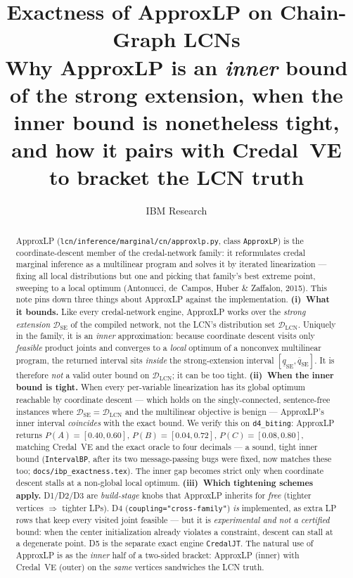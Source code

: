 \documentclass[11pt]{article}
\title{Exactness of ApproxLP on Chain-Graph LCNs\\
\large Why ApproxLP is an \emph{inner} bound of the strong extension, when the
inner bound is nonetheless tight, and how it pairs with Credal~VE to bracket the
LCN truth}
\author{IBM Research}
\date{}
\newcommand{\lo}{\underline}
\newcommand{\hi}{\overline}
\newcommand{\DSE}{\mathcal{D}_{\mathrm{SE}}}
\newcommand{\DLCN}{\mathcal{D}_{\mathrm{LCN}}}
\begin{document}
\maketitle

\begin{abstract}
ApproxLP (\texttt{lcn/inference/marginal/cn/approxlp.py}, class \texttt{ApproxLP}) is the
coordinate-descent member of the credal-network family: it reformulates credal marginal inference as
a multilinear program and solves it by iterated linearization --- fixing all local distributions but
one and picking that family's best extreme point, sweeping to a local optimum (Antonucci, de~Campos,
Huber \& Zaffalon, 2015). This note pins down three things about ApproxLP against the implementation.
\textbf{(i)~What it bounds.} Like every credal-network engine, ApproxLP works over the \emph{strong
extension} $\DSE$ of the compiled network, not the LCN's distribution set $\DLCN$. Uniquely in the
family, it is an \emph{inner} approximation: because coordinate descent visits only \emph{feasible}
product joints and converges to a \emph{local} optimum of a nonconvex multilinear program, the
returned interval sits \emph{inside} the strong-extension interval $[\lo q_{\mathrm{SE}},\hi
q_{\mathrm{SE}}]$. It is therefore \emph{not} a valid outer bound on $\DLCN$; it can be too tight.
\textbf{(ii)~When the inner bound is tight.} When every per-variable linearization has its global
optimum reachable by coordinate descent --- which holds on the singly-connected, sentence-free
instances where $\DSE=\DLCN$ and the multilinear objective is benign --- ApproxLP's inner interval
\emph{coincides} with the exact bound. We verify this on \texttt{d4\_biting}: ApproxLP returns
$P(A){=}[0.40,0.60]$, $P(B){=}[0.04,0.72]$, $P(C){=}[0.08,0.80]$, matching Credal~VE and the exact
oracle to four decimals --- a sound, tight inner bound (\texttt{IntervalBP}, after its two
message-passing bugs were fixed, now matches these too; \texttt{docs/ibp\_exactness.tex}). The inner
gap becomes strict only when coordinate descent stalls at a non-global local optimum.
\textbf{(iii)~Which
tightening schemes apply.} D1/D2/D3 are \emph{build-stage} knobs that ApproxLP inherits for
\emph{free} (tighter vertices $\Rightarrow$ tighter LPs). D4 (\texttt{coupling="cross-family"}) \emph{is}
implemented, as extra LP rows that keep every visited joint feasible --- but it is \emph{experimental
and not a certified} bound: when the center initialization already violates a constraint, descent can
stall at a degenerate point. D5 is the separate exact engine \texttt{CredalJT}. The natural use of
ApproxLP is as the \emph{inner} half of a two-sided bracket: ApproxLP (inner) with Credal~VE (outer)
on the \emph{same} vertices sandwiches the LCN truth.
\end{abstract}
\end{document}
